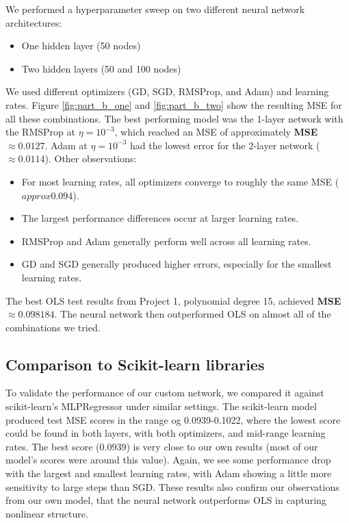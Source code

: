 \documentclass[amssymb,twocolumn,aps,floatfix]{revtex4-2}
\begin{document}
We performed a hyperparameter sweep on two different neural network architectures: 

\begin{itemize}
    \item One hidden layer (50 nodes)
    \item Two hidden layers (50 and 100 nodes)
\end{itemize}

We used different optimizers (GD, SGD, RMSProp, and Adam) and learning rates. Figure \ref{fig:part_b_one} and \ref{fig:part_b_two} show the resulting MSE for all these combinations. The best performing model was the 1-layer network with the RMSProp at $\eta = 10^{-3}$, which reached an MSE of approximately \textbf{MSE} $\approx 0.0127$. Adam at $\eta = 10^{-3}$ had the lowest error for the 2-layer network ($\approx 0.0114$). Other observations: 

\begin{itemize}
    \item For most learning rates, all optimizers converge to roughly the same MSE ($approx 0.094$). 
    \item The largest performance differences occur at larger learning rates.
    \item RMSProp and Adam generally perform well across all learning rates. 
    \item GD and SGD generally produced higher errors, especially for the smallest learning rates. 
\end{itemize}

The best OLS test results from Project 1, polynomial degree 15, achieved \textbf{MSE} $\approx 0.098184$. The neural network then outperformed OLS on almost all of the combinations we tried. 
 
\subsection{Comparison to Scikit-learn libraries}
\label{subsec:part_c_results}

To validate the performance of our custom network, we compared it against scikit-learn's MLPRegressor under similar settings. The scikit-learn model produced test MSE scores in the range og 0.0939-0.1022, where the lowest score could be found in both layers, with both optimizers, and mid-range learning rates. The best score (0.0939) is very close to our own results (most of our model's scores were around this value). Again, we see some performance drop with the largest and smallest learning rates, with Adam showing a little more sensitivity to large steps than SGD. These results also confirm our observations from our own model, that the neural network outperforms OLS in capturing nonlinear structure. 
\end{document}
